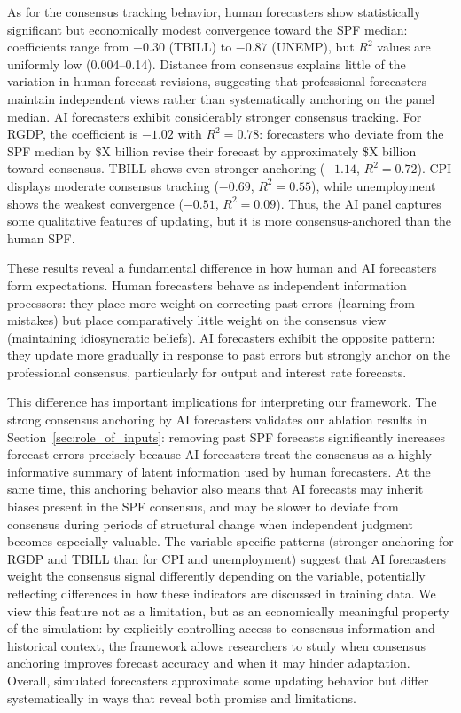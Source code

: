 \documentclass[11pt,letterpaper]{scrartcl}
\begin{document}
As for the consensus tracking behavior, human forecasters show statistically significant but economically modest convergence toward the SPF median: coefficients range from $-0.30$ (TBILL) to $-0.87$ (UNEMP), but $R^2$ values are uniformly low (0.004--0.14). Distance from consensus explains little of the variation in human forecast revisions, suggesting that professional forecasters maintain independent views rather than systematically anchoring on the panel median. AI forecasters exhibit considerably stronger consensus tracking. For RGDP, the coefficient is $-1.02$ with $R^2 = 0.78$: forecasters who deviate from the SPF median by \$X billion revise their forecast by approximately \$X billion toward consensus. TBILL shows even stronger anchoring ($-1.14$, $R^2 = 0.72$). CPI displays moderate consensus tracking ($-0.69$, $R^2 = 0.55$), while unemployment shows the weakest convergence ($-0.51$, $R^2 = 0.09$). Thus, the AI panel captures some qualitative features of updating, but it is more consensus-anchored than the human SPF.

These results reveal a fundamental difference in how human and AI forecasters form expectations. Human forecasters behave as independent information processors: they place more weight on correcting past errors (learning from mistakes) but place comparatively little weight on the consensus view (maintaining idiosyncratic beliefs). AI forecasters exhibit the opposite pattern: they update more gradually in response to past errors but strongly anchor on the professional consensus, particularly for output and interest rate forecasts.

This difference has important implications for interpreting our framework. The strong consensus anchoring by AI forecasters validates our ablation results in Section~\ref{sec:role_of_inputs}: removing past SPF forecasts significantly increases forecast errors precisely because AI forecasters treat the consensus as a highly informative summary of latent information used by human forecasters. At the same time, this anchoring behavior also means that AI forecasts may inherit biases present in the SPF consensus, and may be slower to deviate from consensus during periods of structural change when independent judgment becomes especially valuable. The variable-specific patterns (stronger anchoring for RGDP and TBILL than for CPI and unemployment) suggest that AI forecasters weight the consensus signal differently depending on the variable, potentially reflecting differences in how these indicators are discussed in training data. We view this feature not as a limitation, but as an economically meaningful property of the simulation: by explicitly controlling access to consensus information and historical context, the framework allows researchers to study when consensus anchoring improves forecast accuracy and when it may hinder adaptation. Overall, simulated forecasters approximate some updating behavior but differ systematically in ways that reveal both promise and limitations.
\end{document}
